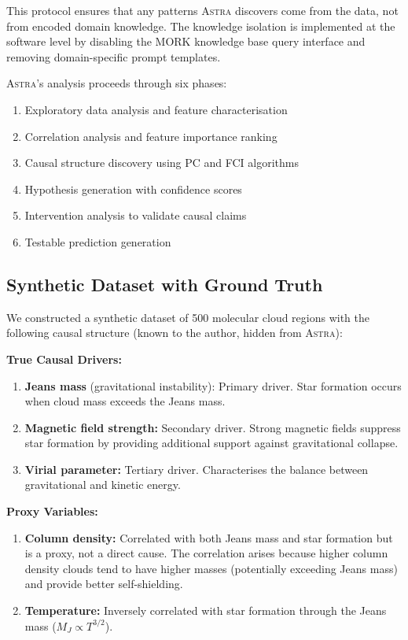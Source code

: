 \documentclass[usenatbib]{rasti}
\newcommand{\astra}{\textsc{Astra}\xspace}
\newcommand{\pc}{PC\xspace}
\newcommand{\fci}{FCI\xspace}
\begin{document}
This protocol ensures that any patterns \astra discovers come from the data, not from encoded domain knowledge.
The knowledge isolation is implemented at the software level by disabling the MORK knowledge base query interface and removing domain-specific prompt templates.

\astra's analysis proceeds through six phases:
\begin{enumerate}
  \item[(i)] Exploratory data analysis and feature characterisation
  \item[(ii)] Correlation analysis and feature importance ranking
  \item[(iii)] Causal structure discovery using \pc and \fci algorithms
  \item[(iv)] Hypothesis generation with confidence scores
  \item[(v)] Intervention analysis to validate causal claims
  \item[(vi)] Testable prediction generation
\end{enumerate}

\subsection{Synthetic Dataset with Ground Truth}
\label{sec:tc6:dataset}

We constructed a synthetic dataset of 500 molecular cloud regions with the following causal structure (known to the author, hidden from \astra):

\textbf{True Causal Drivers:}
\begin{enumerate}
  \item[(i)] \textbf{Jeans mass} (gravitational instability): Primary driver. Star formation occurs when cloud mass exceeds the Jeans mass.
  \item[(ii)] \textbf{Magnetic field strength:} Secondary driver. Strong magnetic fields suppress star formation by providing additional support against gravitational collapse.
  \item[(iii)] \textbf{Virial parameter:} Tertiary driver. Characterises the balance between gravitational and kinetic energy.
\end{enumerate}

\textbf{Proxy Variables:}
\begin{enumerate}
  \item[(i)] \textbf{Column density:} Correlated with both Jeans mass and star formation but is a proxy, not a direct cause. The correlation arises because higher column density clouds tend to have higher masses (potentially exceeding Jeans mass) and provide better self-shielding.
  \item[(ii)] \textbf{Temperature:} Inversely correlated with star formation through the Jeans mass ($M_J \propto T^{3/2}$).
\end{enumerate}
\end{document}
